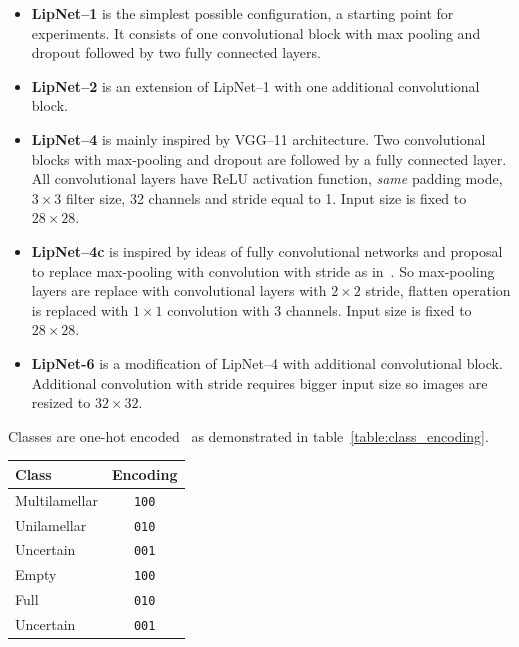 \documentclass[a4paper, 11pt, table]{article}
\begin{document}
\begin{itemize}
\item \textbf{LipNet--1} is the simplest possible configuration, a starting point for experiments. It consists of one convolutional block with max pooling and dropout followed by two fully connected layers.

\item \textbf{LipNet--2} is an extension of LipNet--1 with one additional convolutional block. 

\item \textbf{LipNet--4} is mainly inspired by VGG--11 architecture. Two convolutional blocks with max-pooling and dropout are followed by a fully connected layer. All convolutional layers have ReLU activation function, \textit{same} padding mode, $3 \times 3$ filter size, 32 channels and stride equal to 1. Input size is fixed to $28 \times 28$.

\item \textbf{LipNet--4c} is inspired by ideas of fully convolutional networks and proposal to replace max-pooling with convolution with stride as in~\cite{DBLP:journals/corr/SpringenbergDBR14}. So max-pooling layers are replace with convolutional layers with $2 \times 2$ stride, flatten operation is replaced with $1 \times 1$ convolution with $3$ channels. Input size is fixed to $28 \times 28$.

\item \textbf{LipNet-6} is a modification of LipNet--4 with additional convolutional block. Additional convolution with stride requires bigger input size so images are resized to $32 \times 32$. 
\end{itemize}

Classes are one-hot encoded~\cite{harris2013digital} as demonstrated in table~\ref{table:class_encoding}.

\begin{center}
\label{table:class_encoding}
\begin{tabular}{|lc|}
\toprule 
Class & Encoding \\ 
\midrule 
Multilamellar & \texttt{100} \\ 
Unilamellar & \texttt{010} \\ 
Uncertain & \texttt{001} \\ 
\midrule 
Empty & \texttt{100} \\ 
Full & \texttt{010} \\ 
Uncertain & \texttt{001} \\ 
\bottomrule 
\end{tabular} 
\end{center}
\end{document}
